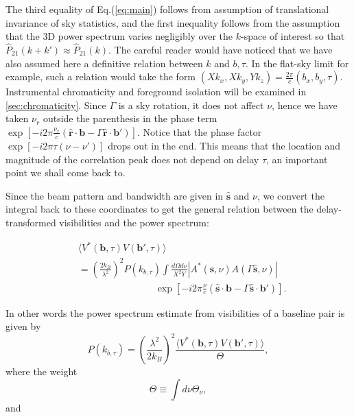 \documentclass[twocolumn,apj,numberedappendix]{emulateapj}
\renewcommand\[{\begin{equation}}
\renewcommand\]{\end{equation}}
\begin{document}
The third equality of Eq.(\ref{eq:main}) follows from assumption of translational invariance of sky statistics, and the first inequality follows from the assumption that
the 3D power spectrum varies negligibly over the $k$-space of interest
so that $\hat{P}_{21}(k+k')\approx\hat{P}_{21}(k)$. The careful reader would have noticed that we have also assumed here a definitive relation between $k$ and $b,\tau$. In the flat-sky limit for example, such a relation would take the form $(Xk_{x},Xk_{y},Yk_{z})=\frac{2\pi}{c}(b_{x},b_{y},\tau)$. Instrumental chromaticity and foreground isolation will be examined in \ref{sec:chromaticity}. Since $\Gamma$
is a sky rotation, it does not affect $\nu$, hence we have taken $\nu_{r}$
outside the parenthesis in the phase term $\exp\left[-i2\pi\frac{\nu_{r}}{c}\left(\hat{\boldsymbol{r}}\cdot\boldsymbol{b}-\Gamma \hat{\boldsymbol{r}}\cdot\boldsymbol{b'}\right)\right]$. Notice that the phase factor $\exp\left[-i2\pi\tau\left(\nu-\nu'\right)\right]$
drops out in the end. This means that the location and magnitude of the correlation peak does not depend on delay $\tau$, an important point we shall come back to. 

Since the beam pattern and bandwidth are given in $\hat{\boldsymbol{s}}$
and $\nu$, we convert the integral back to these coordinates to get
the general relation between the delay-transformed visibilities and
the power spectrum:

\begin{equation}
\begin{aligned} & \langle V^{*}(\boldsymbol{b},\tau)V(\boldsymbol{b'},\tau)\rangle\\
 & =\left(\frac{2k_{B}}{\lambda^{2}}\right)^{2}P(k_{b,\tau})\int\frac{d\Omega d\nu}{X^{2}Y}|A^{*}(\hat{\boldsymbol{s}},\nu)A(\Gamma\hat{\boldsymbol{s}},\nu)|\\
 & \qquad \qquad \qquad \qquad \exp\left[-i2\pi\frac{\nu}{c}\left(\hat{\boldsymbol{s}}\cdot\boldsymbol{b}-\Gamma\hat{\boldsymbol{s}}\cdot\boldsymbol{b'}\right)\right].\end{aligned}
\label{eq:final}
\end{equation}

In other words the power spectrum estimate from visibilities of a baseline pair is given by 
\begin{equation}
 P(k_{b,\tau}) = \left(\frac{\lambda^{2}}{2k_{B}}\right)^{2} \frac{\langle V^{*}(\boldsymbol{b},\tau)V(\boldsymbol{b'},\tau)\rangle}{\Theta}, 
 \label{eq:opp}
\end{equation}
where the weight
\begin{equation}
\Theta \equiv\int d\nu \Theta_{\nu}, 
\label{eq:Theta}
\end{equation}
and 
\end{document}
